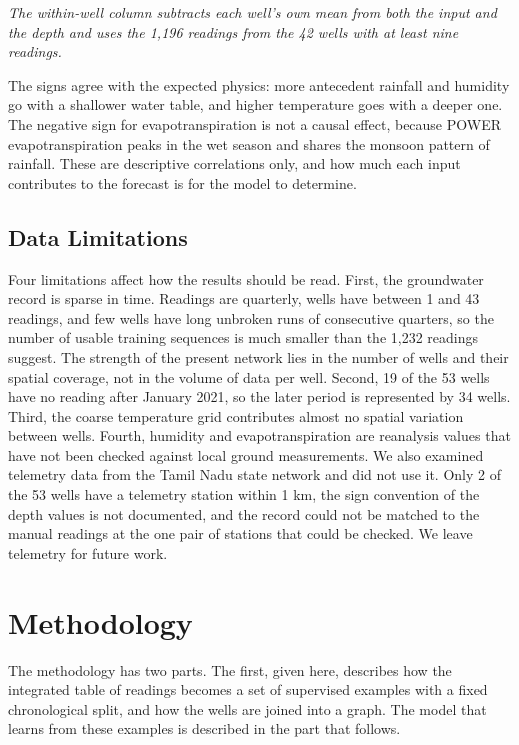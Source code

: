 \documentclass[conference]{IEEEtran}
\begin{document}
\emph{The within-well column subtracts each well's own mean from both the input and the depth and uses the 1,196 readings from the 42 wells with at least nine readings.}

The signs agree with the expected physics: more antecedent rainfall and humidity go with a shallower water table, and higher temperature goes with a deeper one. The negative sign for evapotranspiration is not a causal effect, because POWER evapotranspiration peaks in the wet season and shares the monsoon pattern of rainfall. These are descriptive correlations only, and how much each input contributes to the forecast is for the model to determine.

\subsection{Data Limitations}

Four limitations affect how the results should be read. First, the groundwater record is sparse in time. Readings are quarterly, wells have between 1 and 43 readings, and few wells have long unbroken runs of consecutive quarters, so the number of usable training sequences is much smaller than the 1,232 readings suggest. The strength of the present network lies in the number of wells and their spatial coverage, not in the volume of data per well. Second, 19 of the 53 wells have no reading after January 2021, so the later period is represented by 34 wells. Third, the coarse temperature grid contributes almost no spatial variation between wells. Fourth, humidity and evapotranspiration are reanalysis values that have not been checked against local ground measurements. We also examined telemetry data from the Tamil Nadu state network and did not use it. Only 2 of the 53 wells have a telemetry station within 1 km, the sign convention of the depth values is not documented, and the record could not be matched to the manual readings at the one pair of stations that could be checked. We leave telemetry for future work.

\section{Methodology}

The methodology has two parts. The first, given here, describes how the integrated table of readings becomes a set of supervised examples with a fixed chronological split, and how the wells are joined into a graph. The model that learns from these examples is described in the part that follows.
\end{document}
